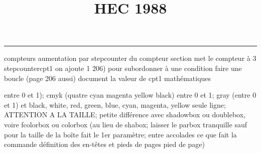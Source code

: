 \documentclass[11pt]{article}%
\title{\bf \vspace{-1cm} HEC 1988} %
\author{} %
\date{} %
\renewcommand{\headrulewidth}{0pt}%
\renewcommand{\footrulewidth}{0.4pt}%
\begin{document}
\maketitle %
\vspace{-1.2cm}\hrule %
\thispagestyle{fancy}

\vspace*{.4cm}


compteurs%
aumentation par stepcounter du compteur section%
met le compteur à 3%
stepcounter{cpt1} on ajoute 1%
206) pour subordonner à une condition %
faire une boucle (page 206 aussi) %
document la valeur de cpt1 
mathématiques\newcommand{\ch}{\operatorname{ch}} 
\newcommand{\sh}{\operatorname{sh}}
\renewcommand{\tanh}{\operatorname{th}}
\renewcommand{\sinh}{\operatorname{sh}}
\renewcommand{\cosh}{\operatorname{ch}}
\newcommand{\argsh}{\operatorname{argsh}}
\newcommand{\argch}{\operatorname{argch}}
\newcommand{\argth}{\operatorname{argth}}
\newcommand{\Id}{\operatorname{Id}}
\renewcommand{\leq}{\leq}
\renewcommand{\geq}{\geq }

\newcommand{\dlim}{\lim}
\newcommand{\dsum}{\sum}
\newcommand{\dprod}{\prod}



entre 0 et 1); cmyk (quatre cyan magenta yellow black) entre 0 et 1;
gray (entre 0 et 1) et black, white, red, green, blue, cyan, magenta,
yellow%
seule ligne; ATTENTION A LA TAILLE; petite différence avec shadowbox ou
doublebox, voire fcolorbox ou colorbox (au lieu de shabox; laisser le
parbox tranquille sauf pour la taille de la boîte
\newcommand{\Tbox}[1]{\begin{center} \shabox{\parbox{0.6
\linewidth}{#1}} \end{center}} %
fait le 1er paramètre; entre accolades ce que fait la commande
définition des en-têtes et pieds de pages\pagestyle{fancy}
\chead{}
\rfoot[ \ \thepage]{\thepage}
\cfoot{}
\lfoot{}
\thispagestyle{fancy} %
pied de page)\renewcommand{\footrulewidth}{0.4pt}
\renewcommand{\headrulewidth}{0.4pt}
\end{document}
